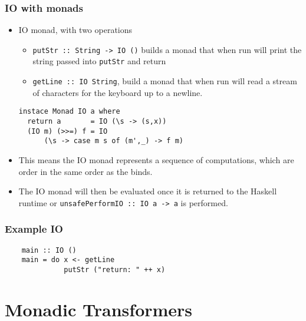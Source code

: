 \documentclass{beamer} %
\begin{document}
\begin{frame}[fragile]\frametitle{IO with monads}
  \begin{itemize}

    \item IO monad, with two operations 
      \begin{itemize}
        \item \texttt{putStr :: String -> IO ()} builds a monad that when run will 
          print the string passed into \texttt{putStr} and return
        \item \texttt{getLine :: IO String}, build a monad that when run
          will read a stream of characters for the keyboard up to a newline.
      \end{itemize}
\begin{verbatim}
instace Monad IO a where
  return a       = IO (\s -> (s,x))
  (IO m) (>>=) f = IO 
      (\s -> case m s of (m',_) -> f m)
\end{verbatim}
    \item This means the IO monad represents a sequence of computations, which are order in the same order 
      as the binds. 

    \item The IO monad will then be evaluated once it is returned to the Haskell runtime or \texttt{unsafePerformIO :: IO a -> a} is performed.

  \end{itemize}
\end{frame}

\begin{frame}[fragile]\frametitle{Example IO}
  \begin{verbatim}
    main :: IO ()
    main = do x <- getLine
              putStr ("return: " ++ x)
  \end{verbatim}
\end{frame}

\section{Monadic Transformers}
\end{document}
